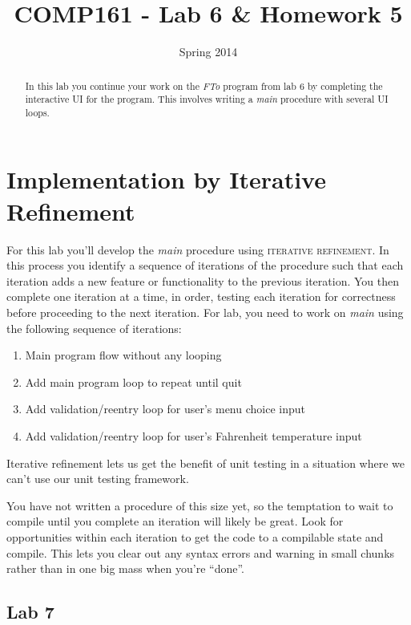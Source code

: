 \documentclass[]{tufte-handout}
\title{COMP161 - Lab 6 \& Homework 5}
\author{}
\date{Spring 2014}
\begin{document}
\maketitle

\begin{abstract}
In this lab you continue your work on the \textit{FTo} program from lab 6 by completing the interactive UI for the program.  This involves writing a \textit{main} procedure with several UI loops.
\end{abstract}

\section{Implementation by Iterative Refinement}

For this lab you'll develop the \textit{main} procedure using \textsc{iterative refinement}. In this process you identify a sequence of  iterations of the procedure such that each iteration adds a new feature or functionality to the previous iteration.  You then complete one iteration at a time, in order, testing each iteration for correctness before proceeding to the next iteration. For lab, you need to work on \textit{main} using the following sequence of iterations:
\begin{enumerate}
\item Main program flow without any looping
\item Add main program loop to repeat until quit
\item Add validation/reentry loop for user's menu choice input
\item Add validation/reentry loop for user's Fahrenheit temperature input
\end{enumerate}
Iterative refinement lets us get the benefit of unit testing in a situation where we can't use our unit testing framework.

You have not written a procedure of this size yet, so the temptation to wait to compile until you complete an iteration will likely be great. Look for opportunities within each iteration to get the code to a compilable state and compile. This lets you clear out any syntax errors and warning in small chunks rather than in one big mass when you're ``done''.

\subsection{Lab 7 }
\end{document}
